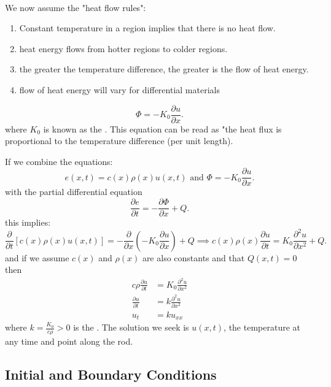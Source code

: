 \documentclass[class=article,crop=false]{standalone}
\begin{document}
~\begin{thm}
We now assume the "heat flow rules":
\begin{enumerate}[label=\arabic*)]
	\item Constant temperature in a region implies that there is no heat flow.
	\item heat energy flows from hotter regions to colder regions.
	\item the greater the temperature difference, the greater  is the flow of heat energy.
	\item flow of heat energy will vary for differential materials
\end{enumerate}
\end{thm}

\begin{thm}
\[
\Phi = -K_0 \frac{\partial u}{\partial x} 
.\] 
where $ K_0$ is known as the . This equation can be read as "the heat flux is proportional to the temperature difference (per unit length). 
\end{thm}

\begin{thm}
If we combine the equations:
\[
	e(x,t) =  c(x) \rho(x) u(x,t) \text{ and } \Phi = -K_0 \frac{\partial u}{\partial x}  
.\] 
with the partial differential equation
\[
\frac{\partial e}{\partial t} = - \frac{\partial \Phi}{\partial x}  + Q
.\] 
this implies:
\[
	\frac{\partial }{\partial t} [c(x)\rho(x) u(x,t)] = -\frac{\partial }{\partial x} \left(-K_0 \frac{\partial u}{\partial x} \right) + Q \implies c(x) \rho(x) \frac{\partial u}{\partial t} = K_0 \frac{\partial^2 u}{\partial {x}^2} +Q 
.\] 
and if we assume $ c(x)$ and  $ \rho(x)$ are also constants and that $ Q(x,t)=0$ then
 \begin{align*}
	 c\rho \frac{\partial u}{\partial t} &= K_0 \frac{\partial^2 u}{\partial {x}^2}\\
	 \frac{\partial u}{\partial t} &= k \frac{\partial^2 u}{\partial x^2}  \\
	 u_t &= k u_{x x} 
\end{align*}
where $ k=\frac{K_0}{c\rho}>0$ is the . The solution we seek is $ u(x,t)$, the temperature at any time and point along the rod. 
\end{thm}

\subsection{Initial and Boundary Conditions}
\end{document}
